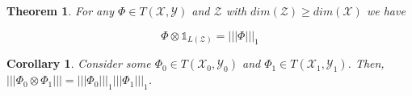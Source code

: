 \documentclass{article}
\newtheorem{theorem}{Theorem}
\newtheorem{corollary}{Corollary}[theorem]
\begin{document}
\begin{theorem}
    For any $\Phi \in T(\mathcal{X},\mathcal{Y})$ and $\mathcal{Z}$ with
    $dim(\mathcal{Z}) \ge dim(\mathcal{X})$ we have

    \[
        \Phi \otimes \mathds{1}_{L(\mathcal{Z})} = \left| \left| \left| \Phi
        \right| \right| \right|_1
    \]
\end{theorem}

\begin{corollary}
    Consider some $\Phi_0 \in T(\mathcal{X}_0,\mathcal{Y}_0)$ and $\Phi_1 \in
    T(\mathcal{X}_1,\mathcal{Y}_1)$. Then,
    $ \left| \left| \left| \Phi_0 \otimes \Phi_1 \right| \right| \right| =
    \left| \left| \left| \Phi_0 \right| \right|\right|_1 \left| \left| \left|
    \Phi_1 \right| \right| \right|_1 $.
\end{corollary}
\end{document}
